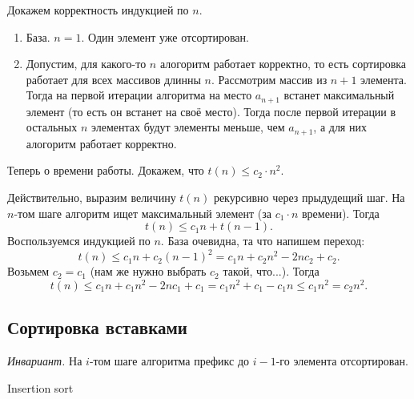     \begin{proof_cor}
        Докажем корректность индукцией по $n$.
        
        \begin{enumerate}
            \item База. $n = 1$. Один элемент уже отсортирован.
            \item Допустим, для какого-то $n$ алогоритм работает корректно, то есть сортировка работает для всех массивов длинны $n$. Рассмотрим массив из $n + 1$ элемента. Тогда на первой итерации алгоритма на место $a_{n+1}$ встанет максимальный элемент (то есть он встанет на своё место). Тогда после первой итерации в остальных $n$ элементах будут элементы меньше, чем $a_{n+1}$, а для них алогоритм работает корректно.
        \end{enumerate}
    \end{proof_cor}

    Теперь о времени работы. Докажем, что $t(n) \leq c_2 \cdot n^2$.

    \begin{proof_cor}
        Действительно, выразим величину $t(n)$ рекурсивно через прыдудещий шаг. На $n$-том шаге алгоритм ищет максимальный элемент (за $c_1 \cdot n$ времени). Тогда
        \[
            t(n) \leq c_1n + t(n-1).
        \]
        Воспользуемся индукцией по $n$. База очевидна, та что напишем переход:
        \[
            t(n) \leq c_1n + c_2(n-1)^2 = c_1n + c_2n^2 - 2nc_2 + c_2.
        \]
        Возьмем $c_2 = c_1$ (нам же нужно выбрать $c_2$ такой, что...).
        Тогда
        \[
            t(n) \leq c_1n + c_1n^2 - 2nc_1 + c_1 = c_1n^2 + c_1 - c_1n \leq c_1n^2 = c_2n^2.
        \]
    \end{proof_cor}

\subsection{Сортировка вставками}

    \textit{Инвариант.} На $i$-том шаге алгоритма префикс до $i-1$-го элемента отсортирован.

    \begin{algorithm}
        \caption{Insertion sort}
        \begin{algorithmic}
            \EndFor
        \end{algorithmic}
    \end{algorithm}

